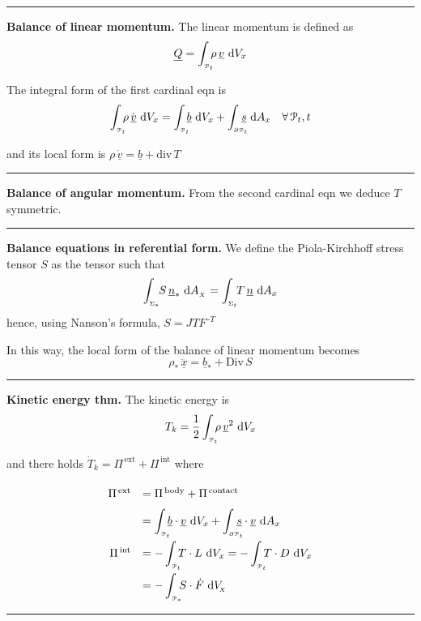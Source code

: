 \rule{0.31\textwidth}{0.2pt}
\smallskip

\textbf{Balance of linear momentum.} The linear momentum is defined as
\begin{equation*}
\underline{Q}=\int_{_{\EuScript{P}_t}}\!\!\! \rho\,\underline{v}\ \mathrm{d} V_x
\end{equation*}

The integral form of the first cardinal eqn is
\begin{equation*}
\int_{_{\pt_t}}\!\!\! \rho\,\dot{\underline{v}}\ \de V_x=\int_{_{\pt_t}}\!\!\! \underline{b}\ \de V_{x}+\int_{_{\partial \pt_t}}\!\!\!\!\! \underline{s}\ \de A_x\quad \forall\, \pt_t,t
\end{equation*}

and its local form is $\boxed{\rho\,\dot{\underline{v}}=\underline{b}+\text{div}\,T}$

\rule{0.31\textwidth}{0.2pt}
\smallskip

\textbf{Balance of angular momentum.} From the second cardinal eqn we deduce $T$ symmetric.

\vspace{-0.5em}

\rule{0.31\textwidth}{0.2pt}
\smallskip

\textbf{Balance equations in referential form.} We define the Piola-Kirchhoff stress tensor $S$ as the tensor such that
\begin{equation*}
\int_{_{\Sigma_*}}\!\! S\,\underline{n}_*\ \mathrm{d} A_{_X}=\int_{_{\Sigma_t}}\!\! T\,\underline{n}\ \mathrm{d} A_x 
\end{equation*}
hence, using Nanson's formula, $\boxed{S=JTF^{\,\text{-}T}}$

\medskip

In this way, the local form of the balance of linear momentum becomes
\begin{equation*}
\boxed{\rho_*\,\ddot{\underline{x}}=\underline{b}_*+\text{Div}\,S}
\end{equation*}

\rule{0.31\textwidth}{0.2pt}
\smallskip

\textbf{Kinetic energy thm.} The kinetic energy is
\begin{equation*}
T_k=\frac{1}{2} \int_{_{\EuScript{P}_t}}\!\!\! \rho\,\underline{v}^2\ \mathrm{d} V_x
\end{equation*}

and there holds $\boxed{\dot{T}_k=\Pi^{\,\text{ext}}+\Pi^{\,\text{int}}}$ where
\vspace{-0.8em}
\begin{equation*}
{\renewcommand*{\arraystretch}{2}
\begin{array}{rl}
\Pi^{\,\text{ext}}&=\Pi^{\,\text{body}}+\Pi^{\,\text{contact}} \\
&=\displaystyle\int_{_{\pt_t}}\!\!\! \underline{b}\cdot \underline{v}\ \de V_{x}+\int_{_{\partial \pt_t}}\!\!\!\!\! \underline{s}\cdot \underline{v}\ \de A_x \\
\Pi^{\,\text{int}}&=-\displaystyle\int_{_{\pt_t}}\!\!\! T\cdot L\ \de V_{x}=-\int_{_{\pt_t}}\!\!\! T\cdot D\ \de V_{x} \\
&=-\displaystyle\int_{_{\pt_*}}\!\!\! S\cdot \dot{F}\ \de V_{\!_X}
\end{array}}
\end{equation*}

\rule{0.31\textwidth}{1pt}




